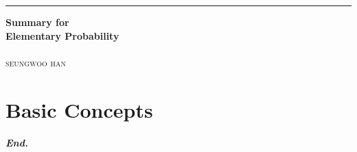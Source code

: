 \documentclass[a4paper,12pt]{report}
\begin{document}

\begin{titlepage}
	\raggedleft

	\rule{1pt}{\textheight}
	\hspace{0.05\textwidth}
	\parbox[b]{0.75\textwidth}{

        {\Huge\bfseries Summary for\\[0.5\baselineskip] Elementary Probability}\\[2\baselineskip]
		\\[4\baselineskip]
		{\Large\textsc{seungwoo han}}

		\vspace{0.5\textheight}
	}
\end{titlepage}
\tableofcontents
\hypersetup{
    linkcolor=Maroon,
    filecolor=black,
    urlcolor=Maroon,
}
\pagebreak


\chapter{Basic Concepts}




\vfill
\begin{center}
    \textbf{\textit{End.}}
\end{center}
\end{document}
